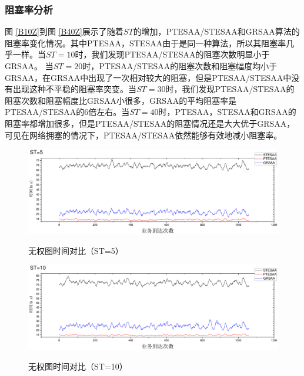 \subsubsection{阻塞率分析}
图 \ref{B10Z}到图 \ref{B40Z}展示了随着$ST$的增加，PTESAA/STESAA和GRSAA算法的阻塞率变化情况。其中PTESAA，STESAA由于是同一种算法，所以其阻塞率几乎一样。当$ST=10$时，我们发现PTESAA/STESAA的阻塞次数明显小于GRSAA。 当$ST=20$时，PTESAA/STESAA的阻塞次数和阻塞幅度均小于GRSAA，在GRSAA中出现了一次相对较大的阻塞，但是PTESAA/STESAA中没有出现这种不平稳的阻塞率突变。当$ST=30$时，我们发现PTESAA/STESAA的阻塞次数和阻塞幅度比GRSAA小很多，GRSAA的平均阻塞率是PTESAA/STESAA的6倍左右。当$ST=40$时，PTESAA，STESAA和GRSAA的阻塞率都增加很多，但是PTESAA/STESAA的阻塞情况还是大大优于GRSAA，可见在网络拥塞的情况下，PTESAA/STESAA依然能够有效地减小阻塞率。
\begin{figure}
\vspace{-0.5cm}
\setlength{\abovecaptionskip}{-0.5cm}
\begin{center}
{\includegraphics[width=1 \textwidth]{figures/B5T.pdf}}
\end{center}
\caption{{\footnotesize{无权图时间对比（ST=5）}}}
\label{B5T}
\end{figure}
\begin{figure}
\vspace{-0.5cm}
\setlength{\abovecaptionskip}{-0.5cm}
\begin{center}
{\includegraphics[width=1 \textwidth]{figures/B10T.pdf}}
\end{center}
\caption{{\footnotesize{无权图时间对比（ST=10）}}}
\label{B10T}
\end{figure}
